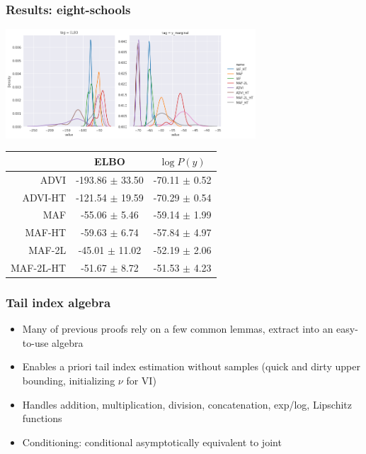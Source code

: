 \documentclass{beamer}
\begin{document}
\begin{frame}
    \frametitle{Results: eight-schools}


    \begin{center}
        \includegraphics[width=0.7\textwidth]{../Figures/eight_schools.png}
        \begin{tabular}{rcc}
            \toprule
                      & ELBO                & $\log P(y)$       \\
            \midrule
            ADVI      & -193.86 $\pm$ 33.50 & -70.11 $\pm$ 0.52 \\
            ADVI-HT   & -121.54 $\pm$ 19.59 & -70.29 $\pm$ 0.54 \\
            MAF       & -55.06 $\pm$ 5.46   & -59.14 $\pm$ 1.99 \\
            MAF-HT    & -59.63 $\pm$ 6.74   & -57.84 $\pm$ 4.97 \\
            MAF-2L    & -45.01 $\pm$ 11.02  & -52.19 $\pm$ 2.06 \\
            MAF-2L-HT & -51.67 $\pm$ 8.72   & -51.53 $\pm$ 4.23 \\
            \bottomrule
        \end{tabular}
    \end{center}
\end{frame}

\begin{frame}
    \frametitle{Tail index algebra}
    \begin{itemize}
        \item Many of previous proofs rely on a few common lemmas, extract into
              an easy-to-use algebra
        \item Enables a priori tail index estimation without samples
              (quick and dirty upper bounding, initializing $\nu$ for VI)
        \item Handles addition, multiplication, division, concatenation, exp/log, Lipschitz functions
        \item Conditioning: conditional asymptotically equivalent to joint
    \end{itemize}
\end{frame}
\end{document}
